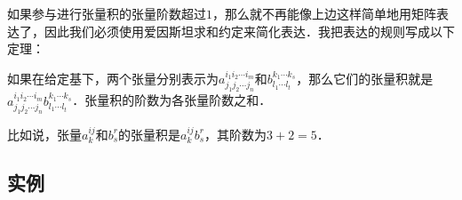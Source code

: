 如果参与进行张量积的张量阶数超过$1$，那么就不再能像上边这样简单地用矩阵表达了，因此我们必须使用爱因斯坦求和约定来简化表达．我把表达的规则写成以下定理：

\begin{theorem}{}
如果在给定基下，两个张量分别表示为$a^{i_1i_2\cdots i_m}_{j_1j_2\cdots j_n}$和$b^{k_1\cdots k_s}_{l_1\cdots l_t}$，那么它们的张量积就是$a^{i_1i_2\cdots i_m}_{j_1j_2\cdots j_n}b^{k_1\cdots k_s}_{l_1\cdots l_t}$．张量积的阶数为各张量阶数之和．
\end{theorem}

比如说，张量$a^{ij}_k$和$b^r_s$的张量积是$a^{ij}_kb^r_s$，其阶数为$3+2=5$．

\subsection{实例}






